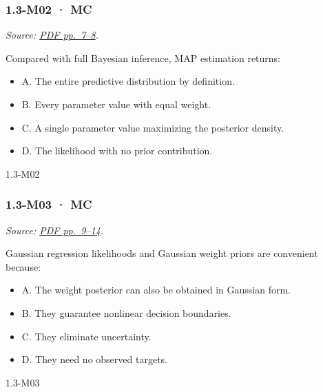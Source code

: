\noindent\begin{minipage}{\linewidth}

\subsubsection{1.3-M02 · MC}\label{m02-mc-2}

\emph{Source:
\href{../Lecture\%20Slides/1.3.\%20Bayesian\%20Learning.pdf\#page=7}{PDF
pp.~7--8}.}

Compared with full Bayesian inference, MAP estimation returns:

\begin{itemize}
\tightlist
\item
  A. The entire predictive distribution by definition.
\item
  B. Every parameter value with equal weight.
\item
  C. A single parameter value maximizing the posterior density.
\item
  D. The likelihood with no prior contribution.
\end{itemize}

\begin{solution}[8mm]{1.3-M02}

\end{solution}
\end{minipage}\par\medskip

\noindent\begin{minipage}{\linewidth}

\subsubsection{1.3-M03 · MC}\label{m03-mc-2}

\emph{Source:
\href{../Lecture\%20Slides/1.3.\%20Bayesian\%20Learning.pdf\#page=9}{PDF
pp.~9--14}.}

Gaussian regression likelihoods and Gaussian weight priors are
convenient because:

\begin{itemize}
\tightlist
\item
  A. The weight posterior can also be obtained in Gaussian form.
\item
  B. They guarantee nonlinear decision boundaries.
\item
  C. They eliminate uncertainty.
\item
  D. They need no observed targets.
\end{itemize}

\begin{solution}[8mm]{1.3-M03}

\end{solution}
\end{minipage}\par\medskip

